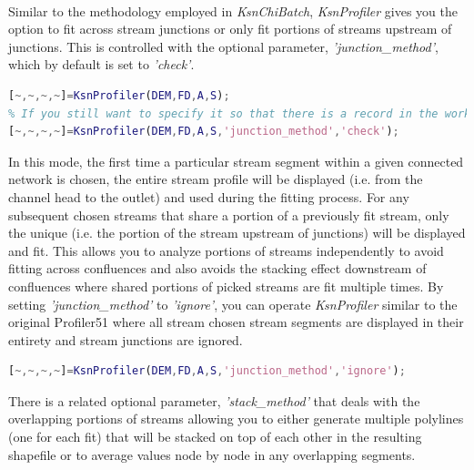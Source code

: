 \paragraph{}Similar to the methodology employed in \textit{KsnChiBatch}, \textit{KsnProfiler} gives you the option to fit across stream junctions or only fit portions of streams upstream of junctions. This is controlled with the optional parameter, \textit{'junction\_method'}, which by default is set to \textit{'check'}. 

 \begin{lstlisting}[language=Matlab]
% To run KsnProfiler in default mode where fits do not occur across stream junctions, no argument is required for 'junction_method':
[~,~,~,~]=KsnProfiler(DEM,FD,A,S);
% If you still want to specify it so that there is a record in the workspace:
[~,~,~,~]=KsnProfiler(DEM,FD,A,S,'junction_method','check');
\end{lstlisting}

\noindent
In this mode, the first time a particular stream segment within a given connected network is chosen, the entire stream profile will be displayed (i.e. from the channel head to the outlet) and used during the fitting process. For any subsequent chosen streams that share a portion of a previously fit stream, only the unique (i.e. the portion of the stream upstream of junctions) will be displayed and fit. This allows you to analyze portions of streams independently to avoid fitting across confluences and also avoids the stacking effect downstream of confluences where shared portions of picked streams are fit multiple times. By setting \textit{'junction\_method'} to \textit{'ignore'}, you can operate \textit{KsnProfiler} similar to the original Profiler51 \citep{Wobus2006} where all stream chosen stream segments are displayed in their entirety and stream junctions are ignored.

 \begin{lstlisting}[language=Matlab]
% To run KsnProfiler similar to how Profiler51 operated and fit all selected streams in their entirety:
[~,~,~,~]=KsnProfiler(DEM,FD,A,S,'junction_method','ignore');
\end{lstlisting}

\noindent
 There is a related optional parameter, \textit{'stack\_method'} that deals with the overlapping portions of streams allowing you to either generate multiple polylines (one for each fit) that will be stacked on top of each other in the resulting shapefile or to average values node by node in any overlapping segments. 
 
